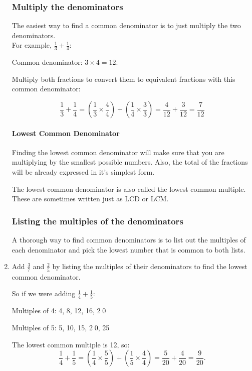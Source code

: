 \documentclass[14pt]{article}
\begin{document}
\begin{enumerate}
\subsubsection*{Multiply the denominators}
The easiest way to find a common denominator is to just multiply the two denominators.\\

For example, $\frac{1}{3} + \frac{1}{4}$:

Common denominator: $3 \times 4 = 12$.

Multiply both fractions to convert them to equivalent fractions with this common denominator:

$$\frac{1}{3} + \frac{1}{4} = (\frac{1}{3} \times \frac{4}{4}) + (\frac{1}{4} \times \frac{3}{3}) = \frac{4}{12}+\frac{3}{12} = \frac{7}{12}$$

\paragraph{Lowest Common Denominator}
Finding the lowest common denominator will make sure that you are multiplying by the  smallest possible numbers. Also,  the total of the fractions will be already expressed in it's simplest form.

The lowest common denominator is also called the lowest common multiple. These are sometimes written just as LCD or LCM.\\

\subsubsection*{Listing the multiples of the denominators}
A thorough way to find common denominators is to list out the multiples of each denominator and pick the lowest number that is common to both lists.

\item Add $\frac{3}{7}$ and $\frac{2}{5}$ by listing the multiples of their denominators to find the lowest common denominator.

So if we were adding $\frac{1}{4} + \frac{1}{5}$:

Multiples of 4: 4, 8, 12, 16, \textcircled{20}

Multiples of 5: 5, 10, 15, \textcircled{20}, 25

The lowest common multiple is 12, so:
$$\frac{1}{4} + \frac{1}{5}
= (\frac{1}{4} \times \frac{5}{5})
+ (\frac{1}{5} \times \frac{4}{4})
= \frac{5}{20}+\frac{4}{20}
= \frac{9}{20}.$$


\end{enumerate}
\end{document}
